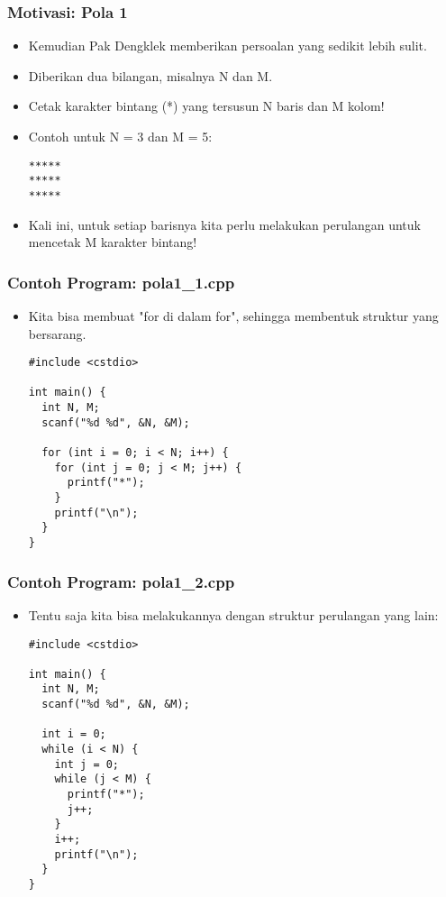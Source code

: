 \begin{frame}[fragile]
\frametitle{Motivasi: Pola 1}
\begin{itemize}
  \item Kemudian Pak Dengklek memberikan persoalan yang sedikit lebih sulit.
  \item Diberikan dua bilangan, misalnya N dan M.
  \item Cetak karakter bintang (*) yang tersusun N baris dan M kolom!

  \item Contoh untuk N = 3 dan M = 5:
\begin{lstlisting}
*****
*****
*****
\end{lstlisting}

  \item Kali ini, untuk setiap barisnya kita perlu melakukan perulangan untuk mencetak M karakter bintang!
\end{itemize}
\end{frame}

\begin{frame}[fragile]
\frametitle{Contoh Program: pola1\_1.cpp}
\begin{itemize}
  \item Kita bisa membuat "for di dalam for", sehingga membentuk struktur yang bersarang.
\begin{lstlisting}
#include <cstdio>

int main() {
  int N, M;
  scanf("%d %d", &N, &M);

  for (int i = 0; i < N; i++) {
    for (int j = 0; j < M; j++) {
      printf("*");
    }
    printf("\n");
  }
}
\end{lstlisting}
\end{itemize}
\end{frame}

\begin{frame}[fragile]
\frametitle{Contoh Program: pola1\_2.cpp}
\begin{itemize}
  \item Tentu saja kita bisa melakukannya dengan struktur perulangan yang lain:
\begin{lstlisting}
#include <cstdio>

int main() {
  int N, M;
  scanf("%d %d", &N, &M);

  int i = 0;
  while (i < N) {
    int j = 0;
    while (j < M) {
      printf("*");
      j++;
    }
    i++;
    printf("\n");
  }
}
\end{lstlisting}
\end{itemize}
\end{frame}

